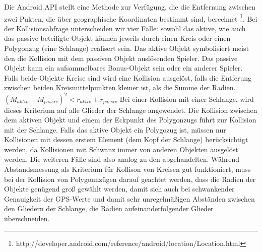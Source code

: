 Die Android API stellt eine Methode zur Verfügung, die die Entfernung zwischen zwei Pukten, die über geographische Koordinaten bestimmt sind, berechnet \footnote{http://developer.android.com/reference/android/location/Location.html}.
Bei der Kollisionsabfrage unterscheiden wir vier Fälle: sowohl das aktive, wie auch das passive beteiligte Objekt können jeweils durch einen Kreis oder einen Polygonzug (eine Schlange) realisert sein.
Das aktive Objekt symbolisiert meist den die Kollision mit dem passiven Objekt auslösenden Spieler.
Das passive Objekt kann ein aufsammelbares Bonus-Objekt sein oder ein anderer Spieler.
Falls beide Objekte Kreise sind wird eine Kollision ausgelöst, falls die Entferung zwischen beiden Kreismittelpunkten kleiner ist, als die Summe der Radien.
$(M_{aktiv}-M_{passiv})^2<r_{aktiv}+r_{passiv}$
Bei einer Kollision mit einer Schlange, wird dieses Kriterium auf alle Glieder der Schlange angewendet. Die Kollision zwischen dem aktiven Objekt und einem der Eckpunkt des Polygonzugs führt zur Kollision mit der Schlange. 
Falls das aktive Objekt ein Polygozug ist, müssen nur Kollisionen mit dessen erstem Element (dem Kopf der Schlange) berücksichtigt werden, da Kollisionen mit Schwanz immer von anderen Objekten ausgelöst werden. Die weiteren Fälle sind also analog zu den abgehandelten.
Während Abstandsmessung als Kriterium für Kollison von Kreisen gut funktioniert, muss bei der Kollision von Polygonnzügen darauf geachtet werden, dass die Radien der Objekte genügend groß gewählt werden, damit sich auch bei schwankender Genauigkeit der GPS-Werte und damit sehr unregelmäßigen Abständen zwischen den Gliedern der Schlange, die Radien aufeinanderfolgender Glieder überschneiden.
